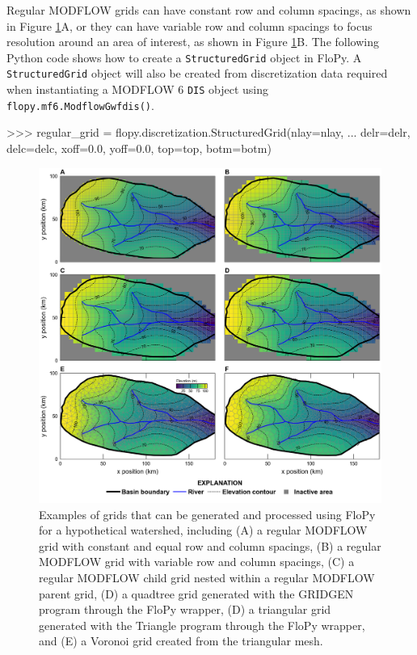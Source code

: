 \documentclass[11pt, oneside]{article}  	%
\begin{document}
Regular MODFLOW grids can have constant row and column spacings, as shown in Figure \ref{fig:grids}A, or they can have variable row and column spacings to focus resolution around an area of interest, as shown in Figure \ref{fig:grids}B. The following Python code shows how to create a \texttt{StructuredGrid} object in FloPy. A \texttt{StructuredGrid} object will also be created from discretization data required when instantiating a MODFLOW 6 \texttt{DIS} object using \texttt{flopy.mf6.ModflowGwfdis()}. 

\begin{python}
>>> regular_grid = flopy.discretization.StructuredGrid(nlay=nlay, 
... delr=delr, delc=delc, xoff=0.0, yoff=0.0, top=top, botm=botm)
\end{python}


\begin{figure}[ht!]
	\begin{center}
		\includegraphics{figures/grids_geoprocessing.png}
	\end{center}
	\caption{Examples of grids that can be generated and processed using FloPy for a hypothetical watershed, including (A) a regular MODFLOW grid with constant and equal row and column spacings, (B) a regular MODFLOW grid with variable row and column spacings, (C) a regular MODFLOW child grid nested within a regular MODFLOW parent grid, (D) a quadtree grid generated with the GRIDGEN program \citep{gridgen} through the FloPy wrapper, (D) a triangular grid generated with the Triangle program \citep{trianglemesh} through the FloPy wrapper, and (E) a Voronoi grid created from the triangular mesh.}\label{fig:grids}
\end{figure}
\end{document}

